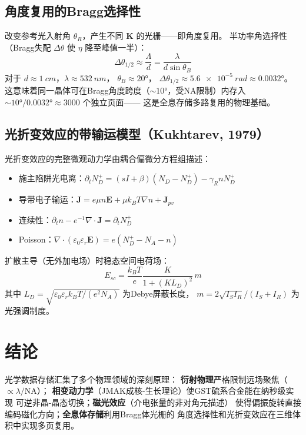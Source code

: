 \documentclass[11pt,a4paper,twoside]{article}
\theoremstyle{definition}\newtheorem{definition}{定义}[section]
\theoremstyle{plain}\newtheorem{theorem}{定理}[section]
\theoremstyle{remark}\newtheorem{remark}{注解}[section]
\begin{document}
\subsection{角度复用的Bragg选择性}

改变参考光入射角 $\theta_R$，产生不同 $\mathbf{K}$ 的光栅——即角度复用。
半功率角选择性（Bragg失配 $\Delta\theta$ 使 $\eta$ 降至峰值一半）：
\begin{equation}
  \Delta\theta_{1/2} \approx \frac{\Lambda}{d}
                         = \frac{\lambda}{d\sin\theta_B}
\end{equation}
对于 $d \approx \SI{1}{cm}$，$\lambda \approx \SI{532}{nm}$，
$\theta_B \approx \ang{20}$，
$\Delta\theta_{1/2} \approx \SI{5.6e-5}{rad} \approx \ang{0.0032}$。
这意味着同一晶体可在Bragg角度跨度（$\sim \ang{10}$，受NA限制）内存入
$\sim \ang{10} / \ang{0.0032} \approx 3000$ 个独立页面——
这是全息存储多路复用的物理基础。

\subsection{光折变效应的带输运模型（Kukhtarev, 1979）}

光折变效应的完整微观动力学由耦合偏微分方程组描述：
\begin{itemize}
  \item 施主陷阱光电离：$\partial_t N_D^+ = (sI+\beta)(N_D-N_D^+) - \gamma_R n N_D^+$
  \item 导带电子输运：$\mathbf{J} = e\mu n\mathbf{E} + \mu k_B T \nabla n + \mathbf{J}_{pv}$
  \item 连续性：$\partial_t n - e^{-1}\nabla\cdot\mathbf{J} = \partial_t N_D^+$
  \item Poisson：$\nabla\cdot(\varepsilon_0\varepsilon_r\mathbf{E}) = e(N_D^+ - N_A - n)$
\end{itemize}
扩散主导（无外加电场）时稳态空间电荷场：
\begin{equation}
  E_{sc} = \frac{k_B T}{e} \frac{K}{1 + (K L_D)^2}\, m
\end{equation}
其中 $L_D = \sqrt{\varepsilon_0\varepsilon_r k_B T / (e^2 N_A)}$ 为Debye屏蔽长度，
$m = 2\sqrt{I_S I_R}/(I_S + I_R)$ 为光强调制度。

\section{结论}

光学数据存储汇集了多个物理领域的深刻原理：
\textbf{衍射物理}严格限制远场聚焦（$\propto \lambda/\text{NA}$）；
\textbf{相变动力学}（JMAK成核-生长理论）使GST硫系合金能在纳秒级实现
可逆非晶-晶态切换；\textbf{磁光效应}（介电张量的非对角元描述）
使得偏振旋转直接编码磁化方向；\textbf{全息体存储}利用Bragg体光栅的
角度选择性和光折变效应在三维体积中实现多页复用。
\end{document}
